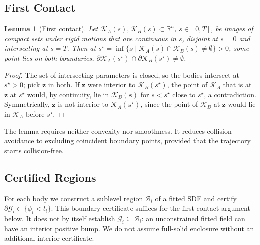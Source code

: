 \documentclass[journal]{IEEEtran}
\newtheorem{lemma}{Lemma}
\theoremstyle{definition}
\newcommand{\R}{\mathbb{R}}
\begin{document}
\subsection{First Contact}
\begin{lemma}[First contact]\label{lem:contact}
Let $\mathcal K_A(s),\mathcal K_B(s)\subset\R^n$, $s\in[0,T]$, be images of compact sets under rigid
motions that are continuous in $s$, disjoint at $s=0$ and intersecting at $s=T$. Then at
$s^\star=\inf\{s\mid\mathcal K_A(s)\cap\mathcal K_B(s)\neq\emptyset\}>0$, some point lies on both
boundaries, $\partial\mathcal K_A(s^\star)\cap\partial\mathcal K_B(s^\star)\neq\emptyset$.
\end{lemma}
\begin{proof}
The set of intersecting parameters is closed, so the bodies intersect at $s^\star>0$; pick $\mathbf z$
in both. If $\mathbf z$ were interior to $\mathcal K_B(s^\star)$, the point of $\mathcal K_A$ that
is at $\mathbf z$ at $s^\star$ would, by continuity, lie in $\mathcal K_B(s)$ for $s<s^\star$ close
to $s^\star$, a contradiction. Symmetrically, $\mathbf z$ is not interior to $\mathcal K_A(s^\star)$,
since the point of $\mathcal K_B$ at $\mathbf z$ would lie in $\mathcal K_A$ before $s^\star$.
\end{proof}
The lemma requires neither convexity nor smoothness. It reduces collision avoidance to excluding
coincident boundary points, provided that the trajectory starts collision-free.

\subsection{Certified Regions}\label{sec:cert-body}
For each body we construct a sublevel region $\mathcal B_i$ of a fitted SDF and certify
$\partial\mathcal G_i\subset\{\phi_i<l_i\}$. This boundary certificate suffices for the
first-contact argument below. It does not by itself establish $\mathcal G_i\subseteq\mathcal B_i$:
an unconstrained fitted field can have an interior positive bump. We do not assume full-solid
enclosure without an additional interior certificate.
\end{document}
